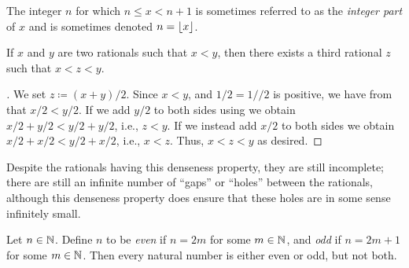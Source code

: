 \begin{rmk}\label{i:4.4.2}
  The integer \(n\) for which \(n \leq x < n + 1\) is sometimes referred to as the \emph{integer part} of \(x\) and is sometimes denoted \(n = \left\lfloor x\right\rfloor\).
\end{rmk}

\begin{prop}\label{i:4.4.3}
  If \(x\) and \(y\) are two rationals such that \(x < y\), then there exists a third rational \(z\) such that \(x < z < y\).
\end{prop}

\begin{proof}[]
  We set \(z \coloneqq (x + y) / 2\).
  Since \(x < y\), and \(1 / 2 = 1 // 2\) is positive, we have from  that \(x / 2 < y / 2\).
  If we add \(y / 2\) to both sides using  we obtain \(x / 2 + y / 2 < y / 2 + y / 2\), i.e., \(z < y\).
  If we instead add \(x / 2\) to both sides we obtain \(x / 2 + x / 2 < y / 2 + x / 2\), i.e., \(x < z\).
  Thus, \(x < z < y\) as desired.
\end{proof}

\begin{note}
  Despite the rationals having this denseness property, they are still incomplete;
  there are still an infinite number of ``gaps'' or ``holes'' between the rationals, although this denseness property does ensure that these holes are in some sense infinitely small.
\end{note}

\begin{ac}\label{i:ac:4.4.2}
  Let \(n \in \mathbb{N}\).
  Define \(n\) to be \emph{even} if \(n = 2m\) for some \(m \in \mathbb{N}\), and \emph{odd} if \(n = 2m + 1\) for some \(m \in \mathbb{N}\).
  Then every natural number is either even or odd, but not both.
\end{ac}

